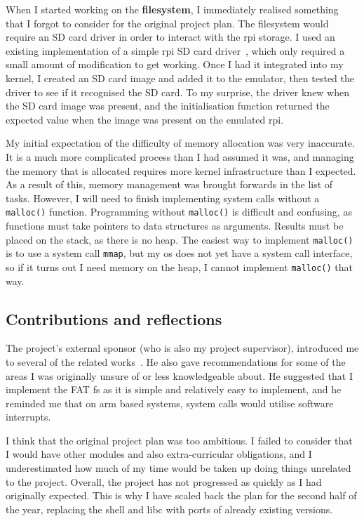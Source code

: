 \documentclass{article}
\begin{document}
When I started working on the \textbf{filesystem}, I immediately realised
something that I forgot to consider for the original project plan. The
filesystem would require an SD card driver in order to interact with the
\gls{rpi} storage. I used an existing implementation of a simple \gls{rpi} SD
card driver~\cite{rpi-boot-gh}, which only required a small amount of
modification to get working. Once I had it integrated into my kernel, I created
an SD card image and added it to the emulator, then tested the driver to see if
it recognised the SD card. To my surprise, the driver knew when the SD card
image was present, and the initialisation function returned the expected value
when the image was present on the emulated \gls{rpi}.

My initial expectation of the difficulty of memory allocation was very
inaccurate. It is a much more complicated process than I had assumed it was,
and managing the memory that is allocated requires more kernel infrastructure
than I expected. As a result of this, memory management was brought forwards in
the list of tasks. However, I will need to finish implementing system calls
without a \texttt{malloc()} function. Programming without \texttt{malloc()} is
difficult and confusing, as functions must take pointers to data structures as
arguments. Results must be placed on the stack, as there is no heap. The
easiest way to implement \texttt{malloc()} is to use a system call
\texttt{mmap}, but my \gls{os} does not yet have a system call interface, so if
it turns out I need memory on the heap, I cannot implement \texttt{malloc()}
that way.

\subsection{Contributions and reflections}
The project's external sponsor (who is also my project supervisor), introduced
me to several of the related works~\cite{netBSD-git, riscOS-source}. He also
gave recommendations for some of the areas I was originally unsure of or less
knowledgeable about. He suggested that I implement the FAT \gls{fs} as it is
simple and relatively easy to implement, and he reminded me that on \gls{arm}
based systems, system calls would utilise software interrupts.

I think that the original project plan was too ambitious. I failed to consider
that I would have other modules and also extra-curricular obligations, and I
underestimated how much of my time would be taken up doing things unrelated to
the project. Overall, the project has not progressed as quickly as I had
originally expected. This is why I have scaled back the plan for the second
half of the year, replacing the shell and libc with ports of already existing
versions.
\end{document}
